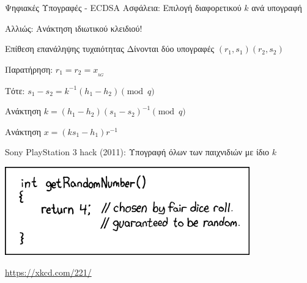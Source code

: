 \documentclass[handout]{beamer}
\begin{document}
\begin{frame}[allowframebreaks]{Ψηφιακές Υπογραφές - ECDSA}
\framebreak
\alert{Ασφάλεια: Επιλογή διαφορετικού $k$ ανά υπογραφή}

Αλλιώς: Ανάκτηση ιδιωτικού κλειδιού!

\begin{block}{Επίθεση επανάληψης τυχαιότητας}
Δίνονται δύο υπογραφές $(r_1,s_1) (r_2,s_2)$

Παρατήρηση: $r_1 = r_2 = x__{kG}$

Τότε: $s_1 - s_2 = k^{-1}(h_1 - h_2) \pmod{q}$

Ανάκτηση $k = (h_1 - h_2)(s_1 - s_2)^{-1} \pmod{q}$

Ανάκτηση $x = (ks_1 - h_1){r^{-1}}$
\end{block}

\framebreak
Sony PlayStation 3 hack (2011): Υπογραφή όλων των παιχνιδιών με ίδιο $k$
\begin{center}
\includegraphics[scale=0.5]{random_number.png}

\href{https://xkcd.com/221/}{https://xkcd.com/221/}
\end{center}
\end{frame}
\end{document}
